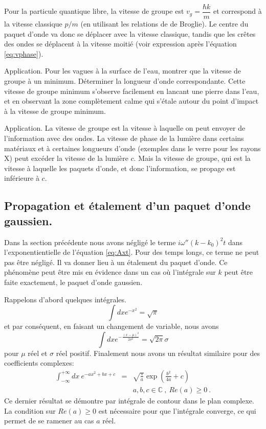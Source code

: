 \documentclass{book}
\begin{document}
Pour la particule quantique libre, la vitesse de groupe est 
$v_g = \dfrac{\hbar k}{m}$ et correspond à la vitesse classique $p/m$ (en utilisant les relations de de Broglie). Le centre du paquet d'onde va donc se déplacer avec la vitesse classique, tandis que les crêtes des ondes se déplacent à la vitesse moitié (voir expression après l'équation \eqref{eq:vphase}).

Application. Pour les vagues à la surface de l'eau, montrer que la vitesse de groupe à un minimum. Déterminer la longueur d'onde correspondante. Cette vitesse de groupe minimum s'observe facilement en lancant une pierre dans l'eau, et en observant la zone complètement calme qui s'étale autour du point d'impact à la vitesse de groupe minimum.

Application. La vitesse de groupe est la vitesse à laquelle on peut envoyer de l'information avec des ondes. La vitesse de phase de la lumière dans certains matériaux et à certaines longueurs d'onde (exemples dans le verre pour les rayons X) peut excéder la vitesse de la lumière $c$. Mais la vitesse de groupe, qui est la vitesse à laquelle les paquets d'onde, et donc l'information, se propage est inférieure à $c$.


\subsection{Propagation et étalement d'un paquet d'onde gaussien.}

Dans la section précédente nous avons négligé le terme $i\omega'' (k-k_0)^2 t$ dans l'exponentientielle de l'équation \eqref{eq:Axt}. Pour des temps longs, ce terme ne peut pas être négligé. Il va donner lieu à un étalement du paquet d'onde. Ce phénomène peut être mis en évidence dans un cas où l'intégrale sur $k$ peut  être faite exactement, le paquet d'onde gaussien.

Rappelons d'abord quelques intégrales.
\begin{equation}
\int dx e^{-x^2} = \sqrt{\pi}
\end{equation}
et par conséquent, en faisant un changement de variable, nous avons
\begin{equation}
\int dx e^{-\frac{(x-\mu)^2}{2 \sigma^2}} = \sqrt{2\pi}\sigma
\end{equation}
pour $\mu$ réel et $\sigma$ réel positif.
Finalement nous avons un résultat similaire pour des coefficients complexes:
\begin{eqnarray}
\int_{- \infty}^{+\infty} dx\ e^{-ax^2 +bx +c}&=& \sqrt{\frac{\pi}{a}} \exp (\frac{b^2}{4a} + c)\nonumber\\
& & a,b,c\in \mathbb{C}\ , \ Re(a)\geq 0\ .
\label{eq:gaussianInt}
\end{eqnarray}
Ce dernier résultat se démontre par intégrale de contour dans le plan complexe. La condition sur $Re(a)\geq 0$ est nécessaire pour que l'intégrale converge, ce qui permet de se ramener au cas $a$ réel.
\end{document}
